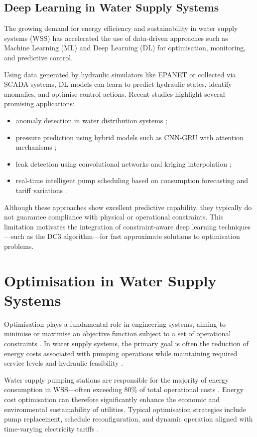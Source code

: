 \subsection{Deep Learning in Water Supply Systems}

The growing demand for energy efficiency and sustainability in water supply systems (WSS) has accelerated the use of data-driven approaches such as Machine Learning (ML) and Deep Learning (DL) for optimisation, monitoring, and predictive control.

Using data generated by hydraulic simulators like EPANET or collected via SCADA systems, DL models can learn to predict hydraulic states, identify anomalies, and optimise control actions. Recent studies highlight several promising applications: 
\begin{itemize}
    \item anomaly detection in water distribution systems \cite{rfc12};
    \item pressure prediction using hybrid models such as CNN-GRU with attention mechanisms \cite{rfc11};
    \item leak detection using convolutional networks and kriging interpolation \cite{rfc13};
    \item real-time intelligent pump scheduling based on consumption forecasting and tariff variations \cite{rfc9}.
\end{itemize}

Although these approaches show excellent predictive capability, they typically do not guarantee compliance with physical or operational constraints. This limitation motivates the integration of constraint-aware deep learning techniques—such as the DC3 algorithm—for fast approximate solutions to optimisation problems.




\section{Optimisation in Water Supply Systems}

Optimisation plays a fundamental role in engineering systems, aiming to minimise or maximise an objective function subject to a set of operational constraints \cite{rfc19}. In water supply systems, the primary goal is often the reduction of energy costs associated with pumping operations while maintaining required service levels and hydraulic feasibility \cite{rfc7, rfc8}.

Water supply pumping stations are responsible for the majority of energy consumption in WSS—often exceeding 80\% of total operational costs \cite{rfc8}. Energy cost optimisation can therefore significantly enhance the economic and environmental sustainability of utilities. Typical optimisation strategies include pump replacement, schedule reconfiguration, and dynamic operation aligned with time-varying electricity tariffs \cite{rfc20}.

